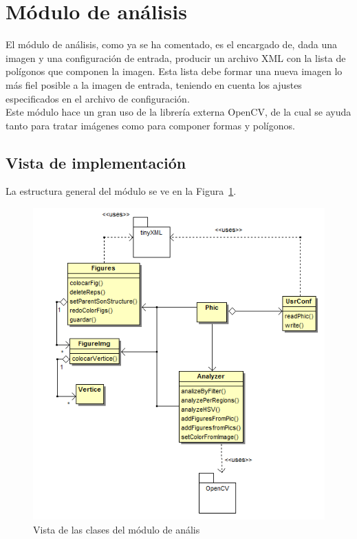 \section{Módulo de análisis}


El módulo de análisis, como ya se ha comentado, es el encargado de, dada una imagen y una configuración de entrada, producir un archivo XML con la lista de polígonos que componen la imagen. Esta lista debe formar una nueva imagen lo más fiel posible a la imagen de entrada, teniendo en cuenta los ajustes especificados en el archivo de configuración.\\

Este módulo hace un gran uso de la librería externa OpenCV, de la cual se ayuda tanto para tratar imágenes como para componer formas y polígonos.

\subsection{Vista de implementación}

La estructura general del módulo se ve en la Figura~\ref{fig:diagramaclasesPHIC}.\\

		\begin{figure}[htbp]
		\centering
		\includegraphics[scale=0.6]{graphics/diagramaclasesPHIC.png}
		\caption{Vista de las clases del módulo de anális}
		\label{fig:diagramaclasesPHIC}
		\end{figure}
		
